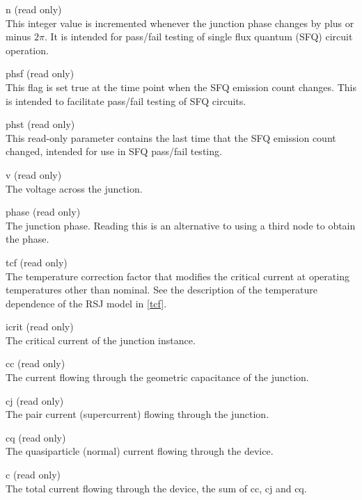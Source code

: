 \begin{description}
\item{\vt n} (read only)\\
This integer value is incremented whenever the junction phase changes
by plus or minus $2\pi$.  It is intended for pass/fail testing of
single flux quantum (SFQ) circuit operation.
 
\item{\vt phsf} (read only)\\
This flag is set true at the time point when the SFQ emission count
changes.  This is intended to facilitate pass/fail testing of SFQ
circuits.

\item{\vt phst} (read only)\\
This read-only parameter contains the last time that the SFQ emission
count changed, intended for use in SFQ pass/fail testing.

\item{\vt v} (read only)\\
The voltage across the junction.

\item{\vt phase} (read only)\\
The junction phase.  Reading this is an alternative to using a third
node to obtain the phase.

\item{tcf} (read only)\\
The temperature correction factor that modifies the critical
current at operating temperatures other than nominal.  See the
description of the temperature dependence of
the RSJ model in \ref{tcf}.

\item{\vt icrit} (read only)\\
The critical current of the junction instance.

\item{\vt cc} (read only)\\
The current flowing through the geometric capacitance of the junction.

\item{\vt cj} (read only)\\
The pair current (supercurrent) flowing through the junction.

\item{\vt cq} (read only)\\
The quasiparticle (normal) current flowing through the device.

\item{\vt c} (read only)\\
The total current flowing through the device, the sum of {\vt cc},
{\vt cj} and {\vt cq}.


\end{description}
